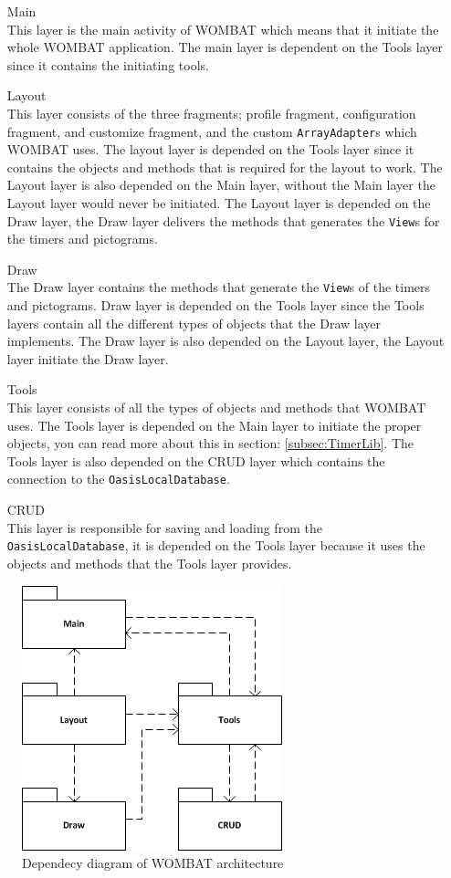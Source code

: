 \begin{itemize}
	\item[Main] \hfill \\	This layer is the main activity of WOMBAT which means that it initiate the whole WOMBAT application. The main layer is dependent on the Tools layer since it contains the initiating tools. 
	\item [Layout] \hfill \\	This layer consists of the three fragments; profile fragment, configuration fragment, and customize fragment, and the custom \texttt{ArrayAdapter}s which WOMBAT uses. The layout layer is depended on the Tools layer since it contains the objects and methods that is required for the layout to work. The Layout layer is also depended on the Main layer, without the Main layer the Layout layer would never be initiated. The Layout layer is depended on the Draw layer, the Draw layer delivers the methods that generates the \texttt{View}s for the timers and pictograms.
	\item [Draw] \hfill \\	The Draw layer contains the methods that generate the \texttt{View}s of the timers and pictograms. Draw layer is depended on the Tools layer since the Tools layers contain all the different types of objects that the Draw layer implements. The Draw layer is also depended on the Layout layer, the Layout layer initiate the Draw layer.
	\item [Tools] \hfill \\	This layer consists of all the types of objects and methods that WOMBAT uses. The Tools layer is depended on the Main layer to initiate the proper objects, you can read more about this in section: \ref{subsec:TimerLib}. The Tools layer is also depended on the CRUD layer which contains the connection to the \texttt{OasisLocalDatabase}.
	\item [CRUD] \hfill \\	This layer is responsible for saving and loading from the \texttt{OasisLocalDatabase}, it is depended on the Tools layer because it uses the objects and methods that the Tools layer provides.
\end{itemize}

\begin{figure}[H]
	\centering
		\includegraphics[scale=0.6]{Images/Implementation/WombatDependency.png}
	\caption{Dependecy diagram of WOMBAT architecture}
	\label{fig:WombatDependency}
\end{figure}

